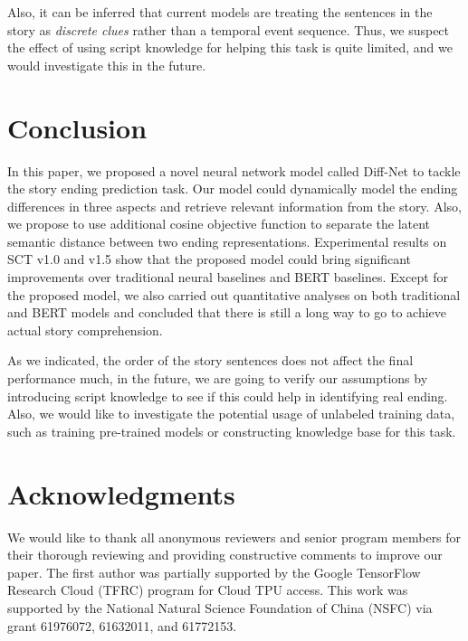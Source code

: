 \documentclass[letterpaper]{article} %
\begin{document}
Also, it can be inferred that current models are treating the sentences in the story as {\em discrete clues} rather than a temporal event sequence. Thus, we suspect the effect of using script knowledge for helping this task is quite limited, and we would investigate this in the future.



\vspace{-1.76mm}
\section{Conclusion}\label{conclusion}
In this paper, we proposed a novel neural network model called Diff-Net to tackle the story ending prediction task.
Our model could dynamically model the ending differences in three aspects and retrieve relevant information from the story.
Also, we propose to use additional cosine objective function to separate the latent semantic distance between two ending representations.
Experimental results on SCT v1.0 and v1.5 show that the proposed model could bring significant improvements over traditional neural baselines and BERT baselines.
Except for the proposed model, we also carried out quantitative analyses on both traditional and BERT models and concluded that there is still a long way to go to achieve actual story comprehension.

As we indicated, the order of the story sentences does not affect the final performance much, in the future, we are going to verify our assumptions by introducing script knowledge to see if this could help in identifying real ending.
Also, we would like to investigate the potential usage of unlabeled training data, such as training pre-trained models or constructing knowledge base for this task.


\vspace{-3.82mm}
\section{Acknowledgments}\label{ack}
We would like to thank all anonymous reviewers and senior program members for their thorough reviewing and providing constructive comments to improve our paper.
The first author was partially supported by the Google TensorFlow Research Cloud (TFRC) program for Cloud TPU access.
This work was supported by the National Natural Science Foundation of China (NSFC) via grant 61976072, 61632011, and 61772153.
\end{document}
